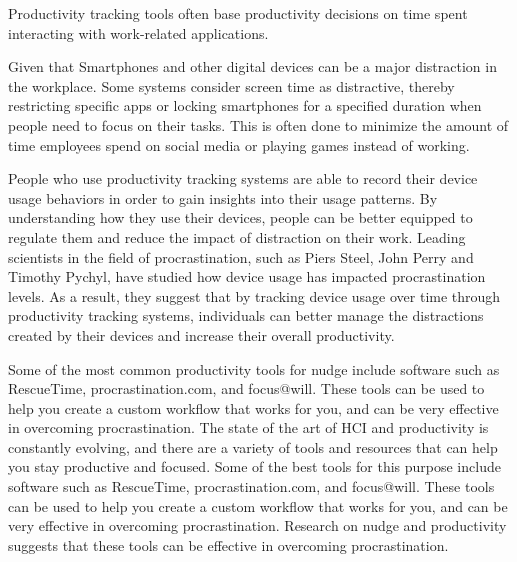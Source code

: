 

Productivity tracking tools often base productivity decisions on  time spent interacting with work-related applications. \cite{Kenton2022Aug}

Given that Smartphones and other digital devices can be a major distraction in the workplace.\cite{Mark2008Jan} Some systems consider screen time as distractive, thereby restricting specific apps or locking smartphones for a specified duration when people need to focus on their tasks. This is often done to minimize the amount of time employees spend on social media or playing games instead of working. \cite{Kim2019May}


People who use productivity tracking systems are able to record their device usage behaviors in order to gain insights into their usage patterns. By understanding how they use their devices, people can be better equipped to regulate them and reduce the impact of distraction on their work. Leading scientists in the field of procrastination, such as Piers Steel, John Perry and Timothy Pychyl, have studied how device usage has impacted procrastination levels. As a result, they suggest that by tracking device usage over time through productivity tracking systems, individuals can better manage the distractions created by their devices and increase their overall productivity.


Some of the most common productivity tools for nudge include software such as RescueTime, procrastination.com, and focus@will. These tools can be used to help you create a custom workflow that works for you, and can be very effective in overcoming procrastination.
The state of the art of HCI and productivity is constantly evolving, and there are a variety of tools and resources that can help you stay productive and focused. Some of the best tools for this purpose include software such as RescueTime, procrastination.com, and focus@will. These tools can be used to help you create a custom workflow that works for you, and can be very effective in overcoming procrastination.
Research on nudge and productivity suggests that these tools can be effective in overcoming procrastination.
